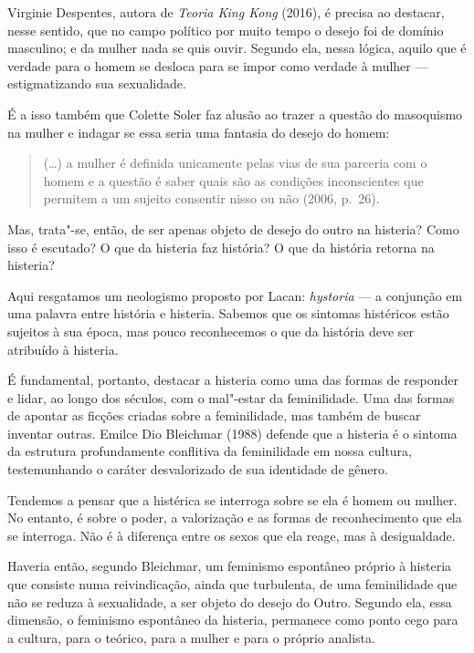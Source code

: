 Virginie Despentes, autora de \emph{Teoria King Kong} (2016), é
precisa ao destacar, nesse sentido, que no campo político por muito
tempo o desejo foi de domínio masculino; e da mulher nada se quis ouvir.
Segundo ela, nessa lógica, aquilo que é verdade para o homem se desloca
para se impor como verdade à mulher --- estigmatizando sua sexualidade.

É a isso também que Colette Soler faz alusão ao trazer a questão do
masoquismo na mulher e indagar se essa seria uma fantasia do desejo do
homem:

\begin{quote}
(\ldots{}) a mulher é definida unicamente pelas vias de sua parceria com o
homem e a questão é saber quais são as condições inconscientes que
permitem a um sujeito consentir nisso ou não (2006, p.~26).
\end{quote}

Mas, trata"-se, então, de ser apenas objeto de desejo do outro na
histeria? Como isso é escutado? O que da histeria faz história? O que da
história retorna na histeria?

Aqui resgatamos um neologismo proposto por Lacan: \emph{hystoria} --- a
conjunção em uma palavra entre história e histeria. Sabemos que os
sintomas histéricos estão sujeitos à sua época, mas pouco reconhecemos o
que da história deve ser atribuído à histeria.

É fundamental, portanto, destacar a histeria como uma das formas de responder e lidar, ao longo dos séculos, com o mal"-estar da feminilidade. Uma das
formas de apontar as ficções criadas sobre a feminilidade, mas também de
buscar inventar outras. Emilce Dio Bleichmar (1988) defende que a
histeria é o sintoma da estrutura profundamente conflitiva da
feminilidade em nossa cultura, testemunhando o caráter desvalorizado de
sua identidade de gênero.

Tendemos a pensar que a histérica se interroga sobre se ela é homem ou
mulher. No entanto, é sobre o poder, a valorização e as formas de
reconhecimento que ela se interroga. Não é à diferença entre os sexos
que ela reage, mas à desigualdade.

Haveria então, segundo Bleichmar, um feminismo espontâneo próprio à
histeria que consiste numa reivindicação, ainda que turbulenta, de uma
feminilidade que não se reduza à sexualidade, a ser objeto do desejo do
Outro. Segundo ela, essa dimensão, o feminismo espontâneo da histeria,
permanece como ponto cego para a cultura, para o teórico, para a mulher
e para o próprio analista.

